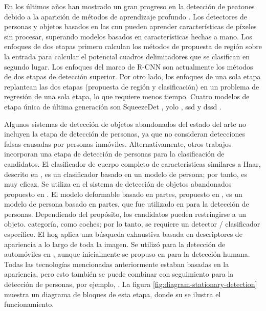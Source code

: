 En los últimos años han mostrado un gran progreso en la detección de peatones debido a la aparición de métodos de aprendizaje profundo \cite{benenson2014years} \cite{zhang2016far} \cite{hosang2015taking}. Los detectores de personas y objetos basados en las \gls{cnn} pueden aprender características de píxeles sin procesar, superando modelos basados en características hechas a mano. Los enfoques de dos etapas primero calculan los métodos de propuesta de región sobre la entrada para calcular el potencial cuadros delimitadores que se clasifican en segundo lugar. Los enfoques del marco de R-CNN \cite{girshick2014rich} \cite{ren2016faster} son actualmente los métodos de dos etapas de detección superior. Por otro lado, los enfoques de una sola etapa replantean las dos etapas (propuesta de región y clasificación) en un problema de regresión de una sola etapa, lo que requiere menos tiempo. Cuatro modelos de etapa única de última generación son SqueezeDet \cite{wu2019squeezedet}, \gls{yolo} \cite{redmon2016look}, \gls{ssd} \cite{Liu_2016} y \gls{dssd} \cite{fu2017dssd}.

Algunos sistemas de detección de objetos abandonados del estado del arte no incluyen la etapa de detección de personas, ya que no consideran detecciones falsas causadas por personas inmóviles. Alternativamente, otros trabajos incorporan una etapa de detección de personas para la clasificación de candidatos. El clasificador de cuerpo completo de características similares a Haar, descrito en \cite{990517}, es un clasificador basado en un modelo de persona; por tanto, es muy eficaz. Se utiliza en el sistema de detección de objetos abandonados propuesto en \cite{LIN2016181}. El modelo deformable basado en partes, propuesto en \cite{5255236}, es un modelo de persona basado en partes, que fue utilizado en \cite{7052354} para la detección de personas. Dependiendo del propósito, los candidatos pueden restringirse a un objeto. categoría, como coches; por lo tanto, se requiere un detector / clasificador específico. El \gls{hog} aplica una búsqueda exhaustiva basada en descriptores de apariencia a lo largo de toda la imagen. Se utilizó para la detección de automóviles en \cite{Wahyono2017CumulativeDF}, aunque inicialmente se propuso en \cite{1467360} para la detección humana. Todas las tecnologías mencionadas anteriormente estaban basadas en la apariencia, pero esto también se puede combinar con seguimiento para la detección de personas, por ejemplo, \cite{5571035}. La figura \ref{fig:diagram-stationary-detection} muestra un diagrama de bloques de esta etapa, donde su se ilustra el funcionamiento.

